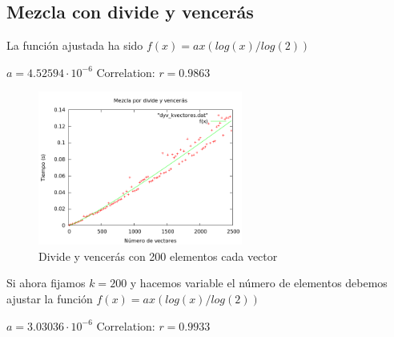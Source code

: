 \subsection{Mezcla con divide y vencer\'as}
\begin{frame}
	\begin{block}

	La funci\'on ajustada ha sido $f(x) = ax(log(x)/log(2))$

	\begin{center}	
	$a               = 4.52594\cdot 10^{-6}$
	Correlation:  $r = 0.9863$
	\end{center}
	\end{block}
\end{frame}

\begin{frame}[Imagen]
	\begin{block}
	
	\begin{figure}[h] 
	\centering
	\includegraphics[width=0.6\textwidth]{../Obligatorio/Graficas/dyv_kvectores.png}
	\caption{Divide y vencerás con 200 elementos cada vector} 
	\end{figure}
	
	\end{block}
\end{frame}

\begin{frame}
	\begin{block}
	
	Si ahora fijamos $k=200$ y hacemos variable el n\'umero de elementos debemos ajustar 			la funci\'on $f(x) = ax(log(x)/log(2))$

	\begin{center}
	$a               = 3.03036\cdot 10^{-6}$
	Correlation:  $r = 0.9933$
	\end{center}
	\end{block}
\end{frame}

